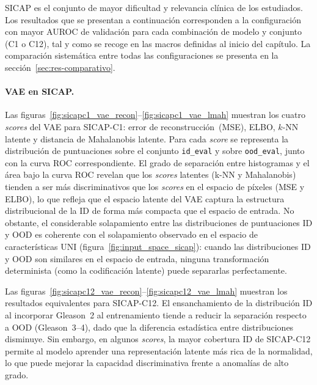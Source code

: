 SICAP es el conjunto de mayor dificultad y relevancia clínica de los estudiados.
Los resultados que se presentan a continuación corresponden a la configuración con
mayor AUROC de validación para cada combinación de modelo y conjunto (C1 o C12),
tal y como se recoge en las macros definidas al inicio del capítulo. La comparación
sistemática entre todas las configuraciones se presenta en la
sección~\ref{sec:res-comparativo}.

\paragraph{VAE en SICAP.}
Las figuras~\ref{fig:sicapc1_vae_recon}--\ref{fig:sicapc1_vae_lmah} muestran los
cuatro \textit{scores} del VAE para SICAP-C1: error de reconstrucción~(MSE),
ELBO, $k$-NN latente y distancia de Mahalanobis latente. Para cada \textit{score}
se representa la distribución de puntuaciones sobre el conjunto \texttt{id\_eval}
y sobre \texttt{ood\_eval}, junto con la curva ROC correspondiente. El grado de
separación entre histogramas y el área bajo la curva ROC revelan que los
\textit{scores} latentes (k-NN y Mahalanobis) tienden a ser más discriminativos
que los \textit{scores} en el espacio de píxeles (MSE y ELBO), lo que refleja que
el espacio latente del VAE captura la estructura distribucional de la ID de forma
más compacta que el espacio de entrada. No obstante, el considerable solapamiento
entre las distribuciones de puntuaciones ID y OOD es coherente con el solapamiento
observado en el espacio de características UNI
(figura~\ref{fig:input_space_sicap}): cuando las distribuciones ID y OOD son
similares en el espacio de entrada, ninguna transformación determinista (como la
codificación latente) puede separarlas perfectamente.

Las figuras~\ref{fig:sicapc12_vae_recon}--\ref{fig:sicapc12_vae_lmah} muestran los
resultados equivalentes para SICAP-C12. El ensanchamiento de la distribución ID al
incorporar Gleason~2 al entrenamiento tiende a reducir la separación respecto a OOD
(Gleason~3--4), dado que la diferencia estadística entre distribuciones disminuye.
Sin embargo, en algunos \textit{scores}, la mayor cobertura ID de SICAP-C12 permite
al modelo aprender una representación latente más rica de la normalidad, lo que puede
mejorar la capacidad discriminativa frente a anomalías de alto grado.

